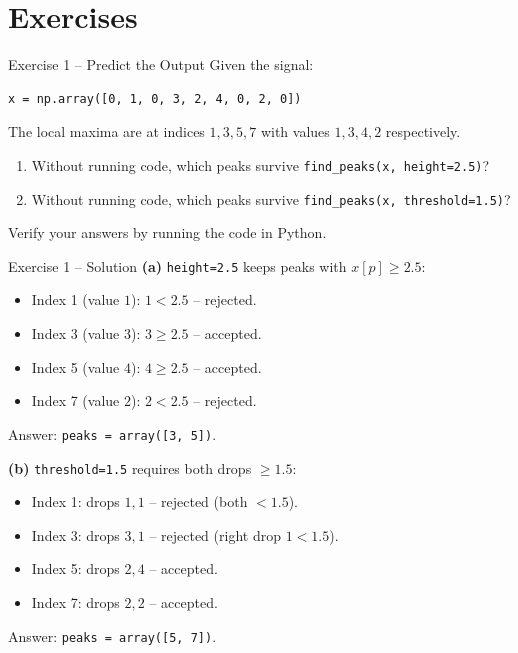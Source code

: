 \documentclass{beamer}
\begin{document}
\section{Exercises}

\begin{frame}[fragile]{Exercise 1 -- Predict the Output}
  Given the signal:
  \begin{lstlisting}
x = np.array([0, 1, 0, 3, 2, 4, 0, 2, 0])
  \end{lstlisting}
  The local maxima are at indices \(1, 3, 5, 7\) with values \(1, 3, 4, 2\) respectively.
  \begin{enumerate}
    \item[(a)] Without running code, which peaks survive \texttt{find\_peaks(x, height=2.5)}?
    \item[(b)] Without running code, which peaks survive \texttt{find\_peaks(x, threshold=1.5)}?
  \end{enumerate}
  Verify your answers by running the code in Python.
\end{frame}

\begin{frame}{Exercise 1 -- Solution}
  \textbf{(a)} \texttt{height=2.5} keeps peaks with \(x[p] \geq 2.5\):
  \begin{itemize}
    \item Index 1 (value \(1\)): \(1 < 2.5\) -- rejected.
    \item Index 3 (value \(3\)): \(3 \geq 2.5\) -- accepted.
    \item Index 5 (value \(4\)): \(4 \geq 2.5\) -- accepted.
    \item Index 7 (value \(2\)): \(2 < 2.5\) -- rejected.
  \end{itemize}
  Answer: \texttt{peaks = array([3, 5])}.

  \textbf{(b)} \texttt{threshold=1.5} requires both drops \(\geq 1.5\):
  \begin{itemize}
    \item Index 1: drops \(1, 1\) -- rejected (both \(< 1.5\)).
    \item Index 3: drops \(3, 1\) -- rejected (right drop \(1 < 1.5\)).
    \item Index 5: drops \(2, 4\) -- accepted.
    \item Index 7: drops \(2, 2\) -- accepted.
  \end{itemize}
  Answer: \texttt{peaks = array([5, 7])}.
\end{frame}
\end{document}
